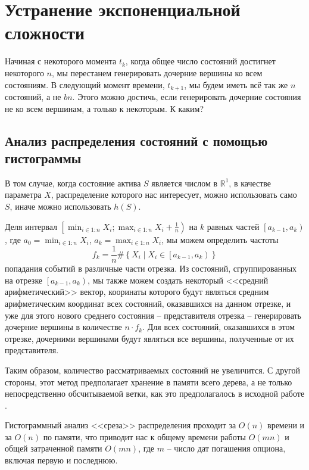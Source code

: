 \documentclass[12pt,twoside,titlepage,сa4paper]{article}
\newcommand{\R}{\ensuremath{\mathbb{R}}}
\begin{document}
\section{Устранение экспоненциальной сложности}
	\par Начиная с некоторого момента $t_k$, когда общее число состояний достигнет некоторого $n$, мы перестанем генерировать дочерние вершины ко всем состояниям. В следующий момент времени, $t_{k+1}$, мы будем иметь всё так же $n$ состояний, а не $bn$. Этого можно достичь, если генерировать дочерние состояния не ко всем вершинам, а только к некоторым. К каким?
	\subsection{Анализ распределения состояний с помощью гистограммы}
		\par В том случае, когда состояние актива $S$ является числом в $\R ^1$, в качестве параметра $X$, распределение которого нас интересует, можно использовать  само $S$, иначе можно использовать $h(S)$. 
		\par Деля интервал $\left[\min_{i\in 1:n} X_i ; \max_{i\in 1:n} X_i + \frac{1}{n}\right)$ на $k$ равных частей $\left[a_{k-1},a_k\right)$, где $a_0 = \min_{i\in 1:n} X_i$, $a_k = \max_{i\in 1:n} X_i$, мы можем определить частоты \[f_k = \frac{1}{n}\#\left\lbrace X_i \middle\vert X_i\in\left[a_{k-1},a_k\right)\right\rbrace\] попадания событий в различные части отрезка. Из состояний, сгруппированных на отрезке $\left[a_{k-1},a_k\right)$, мы также можем создать некоторый <<средний арифметический>> вектор, кооринаты которого будут являться средним арифметическим координат всех состояний, оказавшихся на данном отрезке, и уже для этого нового среднего состояния -- представителя отрезка -- генерировать дочерние вершины в количестве $n\cdot f_k$. Для всех состояний, оказавшихся в этом отрезке, дочерними вершинами будут являться все вершины, полученные от их представителя. 
		\par Таким образом, количество рассматриваемых состояний не увеличится. С другой стороны, этот метод предполагает хранение в памяти всего дерева, а не только непосредственно обсчитываемой ветки, как это предполагалось в исходной работе \cite{Broadie1997}.
		\par Гистограммный анализ <<среза>> распределения проходит за $O\left(n\right)$ времени и за $O\left(n\right)$ по памяти, что приводит нас к общему времени работы $O\left(mn\right)$ и общей затраченной памяти $O\left(mn\right)$, где $m$ -- число дат погашения опциона, включая первую и последнюю.
\end{document}
